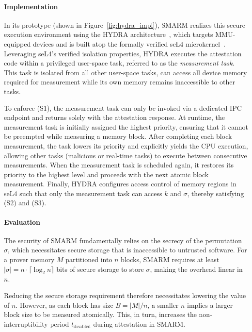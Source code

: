 \documentclass[journal]{IEEEtran}
\begin{document}
\paragraph{\textbf{Implementation}}
In its prototype (shown in Figure~\ref{fig:hydra_impl}), SMARM realizes this secure execution environment using the HYDRA architecture~\cite{hydra}, which targets MMU-equipped devices and is built atop the formally verified seL4 microkernel~\cite{sel4}.
Leveraging seL4's verified isolation properties, HYDRA executes the attestation code within a privileged user-space task, referred to as the \emph{measurement task}.
This task is isolated from all other user-space tasks, can access all device memory required for measurement while its own memory remains inaccessible to other tasks.

To enforce (S1), the measurement task can only be invoked via a dedicated IPC endpoint and returns solely with the attestation response.
At runtime, the measurement task is initially assigned the highest priority, ensuring that it cannot be preempted while measuring a memory block.
After completing each block measurement, the task lowers its priority and explicitly yields the CPU execution, allowing other tasks (malicious or real-time tasks) to execute between consecutive measurements.
When the measurement task is scheduled again, it restores its priority to the highest level and proceeds with the next atomic block measurement.
%
Finally, HYDRA configures access control of memory regions in seL4 such that only the measurement task can access $k$ and $\sigma$, thereby satisfying (S2) and (S3).

\paragraph{\textbf{Evaluation}}
The security of SMARM fundamentally relies on the secrecy of the permutation~$\sigma$, which necessitates secure storage that is inaccessible to untrusted software.
For a prover memory $M$ partitioned into $n$ blocks, SMARM requires at least
$|\sigma| = n \cdot \lceil \log_2 n \rceil$ bits of secure storage to store $\sigma$, making the overhead linear in~$n$.

Reducing the secure storage requirement therefore necessitates lowering the value of $n$.
However, as each block has size $B = |M|/n$, a smaller $n$ implies a larger block size to be measured atomically.
This, in turn, increases the non-interruptibility period $t_{\text{disabled}}$ during attestation in SMARM.
\end{document}
